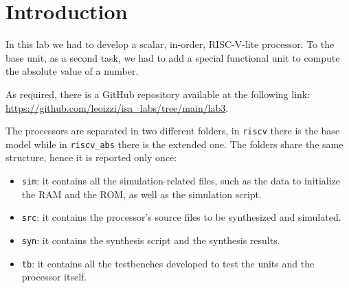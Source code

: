 \chapter{Introduction}

In this lab we had to develop a scalar, in-order, RISC-V-lite processor. To the base unit, as a second task,
we had to add a special functional unit to compute the absolute value of a number.

As required, there is a GitHub repository available at the following link: \url{https://github.com/leoizzi/isa_labs/tree/main/lab3}.

The processors are separated in two different folders, in \verb|riscv| there is the base model while in \verb|riscv_abs| there is
the extended one. The folders share the same structure, hence it is reported only once:

\begin{itemize}
    \item \verb|sim|: it contains all the simulation-related files, such as the data to initialize the RAM and the ROM, as well as the simulation script.
    \item \verb|src|: it contains the processor's source files to be synthesized and simulated.
    \item \verb|syn|: it contains the synthesis script and the synthesis results.
    \item \verb|tb|: it contains all the testbenches developed to test the units and the processor itself.
\end{itemize}
